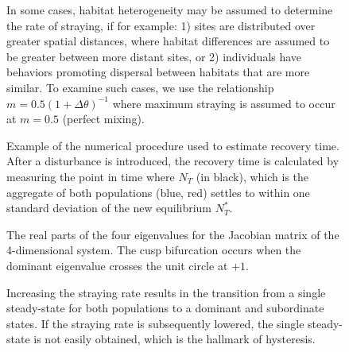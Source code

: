 \documentclass{revtex4}
\newcommand{\beginsupplement}{%
        \clearpage
        \setcounter{table}{0}
        \renewcommand{\thetable}{S\arabic{table}}%
        \setcounter{figure}{0}
        \renewcommand{\thefigure}{S\arabic{figure}}%
     }
\begin{document}

\beginsupplement


\begin{figure}
  \captionsetup{justification=raggedright,
singlelinecheck=false
}
\centering
\caption{
In some cases, habitat heterogeneity may be assumed to determine the rate of straying, if for example:
1) sites are distributed over greater spatial distances, where habitat differences are assumed to be greater between more distant sites, or 2) individuals have behaviors promoting dispersal between habitats that are more similar. To examine such cases, we use the relationship $m= 0.5(1 + \Delta\theta)^{-1}$ where maximum straying is assumed to occur at $m=0.5$ (perfect mixing).
} \label{fig:mthetarelation}
\end{figure}


\begin{figure}
  \captionsetup{justification=raggedright,
singlelinecheck=false
}
\centering
\caption{
Example of the numerical procedure used to estimate recovery time. After a disturbance is introduced, the recovery time is calculated by measuring the point in time where $N_T$ (in black), which is the aggregate of both populations (blue, red) settles to within one standard deviation of the new equilibrium $N_T^*$. 
} \label{fig:recovery}
\end{figure}


\begin{figure}
  \captionsetup{justification=raggedright,
singlelinecheck=false
}
\centering
\caption{
The real parts of the four eigenvalues for the Jacobian matrix of the 4-dimensional system.
The cusp bifurcation occurs when the dominant eigenvalue crosses the unit circle at $+1$. 
} \label{fig:eigs}
\end{figure}


\begin{figure}
  \captionsetup{justification=raggedright,
singlelinecheck=false
}
\centering
\caption{
Increasing the straying rate results in the transition from a single steady-state for both populations to a dominant and subordinate states. If the straying rate is subsequently lowered, the single steady-state is not easily obtained, which is the hallmark of hysteresis.
} \label{fig:hysteresis}
\end{figure}
\end{document}
